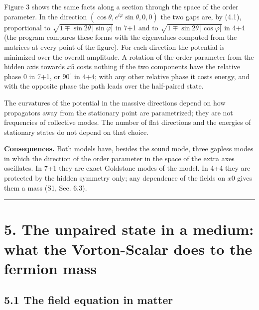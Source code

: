 \documentclass[
  10pt,
]{article}
\begin{document}
Figure 3 shows the same facts along a section through the space of the
order parameter. In the direction
\((\cos\theta,e^{i\varphi}\sin\theta,0,0)\) the two gaps are, by (4.1),
proportional to \(\sqrt{1\mp\sin2\theta\,|\sin\varphi|}\) in 7+1 and to
\(\sqrt{1\mp\sin2\theta\,|\cos\varphi|}\) in 4+4 (the program compares
these forms with the eigenvalues computed from the matrices at every
point of the figure). For each direction the potential is minimized over
the overall amplitude. A rotation of the order parameter from the hidden
axis towards \(x5\) costs nothing if the two components have the
relative phase 0 in 7+1, or \(90^\circ\) in 4+4; with any other relative
phase it costs energy, and with the opposite phase the path leads over
the half-paired state.

The curvatures of the potential in the massive directions depend on how
propagators away from the stationary point are parametrized; they are
not frequencies of collective modes. The number of flat directions and
the energies of stationary states do not depend on that choice.

\textbf{Consequences.} Both models have, besides the sound mode, three
gapless modes in which the direction of the order parameter in the space
of the extra axes oscillates. In 7+1 they are exact Goldstone modes of
the model. In 4+4 they are protected by the hidden symmetry only; any
dependence of the fields on \(x0\) gives them a mass (S1, Sec. 6.3).

\begin{center}\rule{0.5\linewidth}{0.5pt}\end{center}

\hypertarget{the-unpaired-state-in-a-medium-what-the-vorton-scalar-does-to-the-fermion-mass}{%
\section{5. The unpaired state in a medium: what the Vorton-Scalar does
to the fermion
mass}\label{the-unpaired-state-in-a-medium-what-the-vorton-scalar-does-to-the-fermion-mass}}

\hypertarget{the-field-equation-in-matter}{%
\subsection{5.1 The field equation in
matter}\label{the-field-equation-in-matter}}
\end{document}
